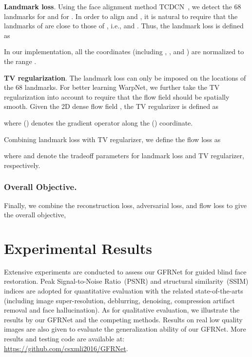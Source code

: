 \documentclass[runningheads]{llncs}
\begin{document}
\textbf{Landmark loss}.
Using the face alignment method TCDCN~\cite{TCDCN}, we detect the 68 landmarks  for  and  for .
In order to align  and , it is natural to require that the landmarks of  are close to those of , i.e.,  and .
Thus, the landmark loss is defined as

In our implementation, all the coordinates (including , ,  and ) are normalized to the range .


\textbf{TV regularization}.
The landmark loss can only be imposed on the locations of the 68 landmarks.
For better learning WarpNet, we further take the TV regularization into account to require that the flow field should be spatially smooth.
Given the 2D dense flow field , the TV regularizer is defined as

where  () denotes the gradient operator along the  () coordinate.


Combining landmark loss with TV regularizer, we define the flow loss as

where  and  denote the tradeoff parameters for landmark loss  and TV regularizer, respectively.
\subsubsection{Overall Objective.}
Finally, we combine the reconstruction loss, adversarial loss, and flow loss to give the overall objective,

\section{Experimental Results}\label{section4}
Extensive experiments are conducted to assess our GFRNet for guided blind face restoration.
Peak Signal-to-Noise Ratio~(PSNR) and structural similarity~(SSIM) indices are adopted for quantitative evaluation with the related state-of-the-arts (including image super-resolution, deblurring, {denoising, compression artifact removal} and face hallucination).
As for qualitative evaluation, we illustrate the results by our GFRNet and the competing methods.
Results on real low quality images are also given to evaluate the generalization ability of our GFRNet.
More results and testing code are available at: \url{https://github.com/csxmli2016/GFRNet}.
\end{document}
